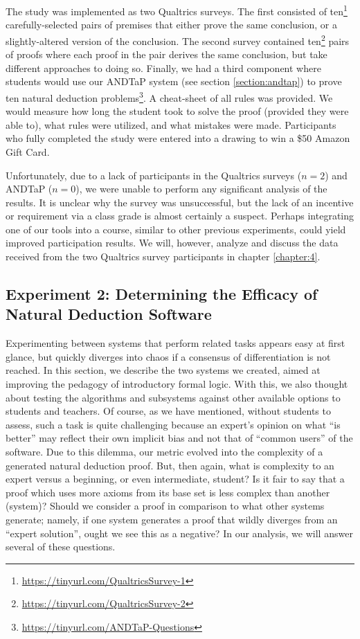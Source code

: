 \documentclass[ms]{uncgdissertationexp2}
\theoremstyle{plain}
\theoremstyle{definition}
\theoremstyle{remark}
\begin{document}
The study was implemented as two Qualtrics surveys. The first consisted of ten\footnote{\url{https://tinyurl.com/QualtricsSurvey-1}} carefully-selected pairs of premises that either prove the same conclusion, or a slightly-altered version of the conclusion. The second survey contained ten\footnote{\url{https://tinyurl.com/QualtricsSurvey-2}} pairs of proofs where each proof in the pair derives the same conclusion, but take different approaches to doing so. Finally, we had a third component where students would use our ANDTaP system (see section \ref{section:andtap}) to prove ten natural deduction problems\footnote{\url{https://tinyurl.com/ANDTaP-Questions}}. A cheat-sheet of all rules was provided. We would measure how long the student took to solve the proof (provided they were able to), what rules were utilized, and what mistakes were made. Participants who fully completed the study were entered into a drawing to win a \$50 Amazon Gift Card.

Unfortunately, due to a lack of participants in the Qualtrics surveys ($n=2$) and ANDTaP ($n=0$), we were unable to perform any significant analysis of the results. It is unclear why the survey was unsuccessful, but the lack of an incentive or requirement via a class grade is almost certainly a suspect. Perhaps integrating one of our tools into a course, similar to other previous experiments, could yield improved participation results. We will, however, analyze and discuss the data received from the two Qualtrics survey participants in chapter \ref{chapter:4}.

\subsection{Experiment 2: Determining the Efficacy of Natural Deduction Software}
Experimenting between systems that perform related tasks appears easy at first glance, but quickly diverges into chaos if a consensus of differentiation is not reached. In this section, we describe the two systems we created, aimed at improving the pedagogy of introductory formal logic. With this, we also thought about testing the algorithms and subsystems against other available options to students and teachers. Of course, as we have mentioned, without students to assess, such a task is quite challenging because an expert's opinion on what ``is better'' may reflect their own implicit bias and not that of ``common users'' of the software. Due to this dilemma, our metric evolved into the complexity of a generated natural deduction proof. But, then again, what is complexity to an expert versus a beginning, or even intermediate, student? Is it fair to say that a proof which uses more axioms from its base set is less complex than another (system)? Should we consider a proof in comparison to what other systems generate; namely, if one system generates a proof that wildly diverges from an ``expert solution'', ought we see this as a negative? In our analysis, we will answer several of these questions.  
\end{document}

